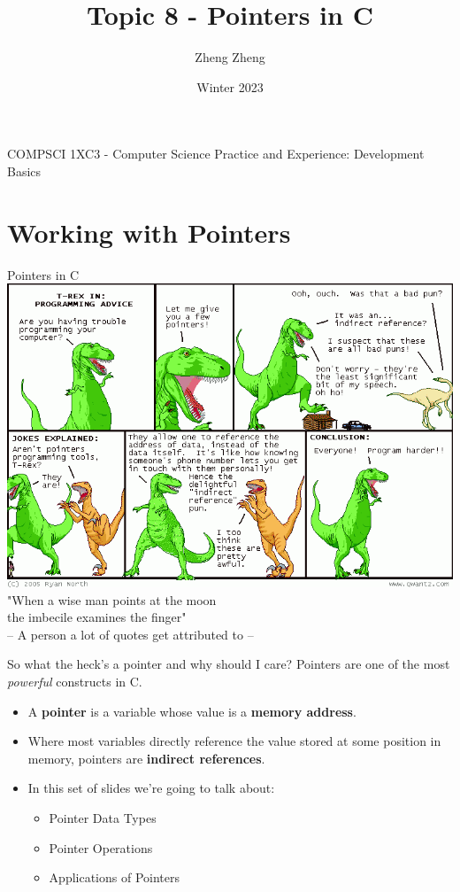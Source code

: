 \documentclass[11pt]{beamer}
\author{Zheng Zheng}
\title{Topic 8 - Pointers in C}
\institute{McMaster University}
\date{Winter 2023}
\begin{document}
\begin{frame}
\center
COMPSCI 1XC3 - Computer Science Practice and Experience:
Development Basics
\titlepage
\end{frame}

\begin{frame}
\tableofcontents
\end{frame}

\section[Syntax]{Working with Pointers} %
\begin{frame}{Pointers in C}
\center
\includegraphics[scale=0.28]{DCPointers.png} \\
"When a wise man points at the moon \\the imbecile examines the finger" \\
-- A person a lot of quotes get attributed to -- 
\end{frame}

\begin{frame}{So what the heck's a pointer and why should I care?}
Pointers are one of the most \textit{powerful} constructs in C.
\begin{itemize}
\item A \textbf{pointer} is a variable whose value is a \textbf{memory address}.
\item Where most variables directly reference the value stored at some position in memory, pointers are \textbf{indirect references}.  
\item In this set of slides we're going to talk about:
\begin{itemize}
\item Pointer Data Types
\item Pointer Operations
\item Applications of Pointers
\end{itemize}
\end{itemize}
\end{frame}
\end{document}
